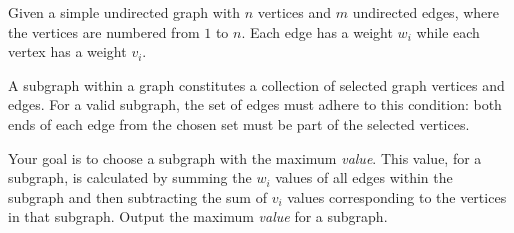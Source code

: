 Given a simple undirected graph with $n$ vertices and $m$ undirected edges,
where the vertices are numbered from $1$ to $n$.
Each edge has a weight $w_i$ while each vertex has a weight $v_i$.

A subgraph within a graph constitutes a collection of selected graph vertices and edges. For a valid subgraph, the set of edges must adhere to this condition: both ends of each edge from the chosen set must be part of the selected vertices.

Your goal is to choose a subgraph with the maximum \textit{value}.
This value, for a subgraph, is calculated by summing the $w_i$ values of all edges within the subgraph and then subtracting the sum of $v_i$ values corresponding to the vertices in that subgraph.
Output the maximum \textit{value} for a subgraph.
